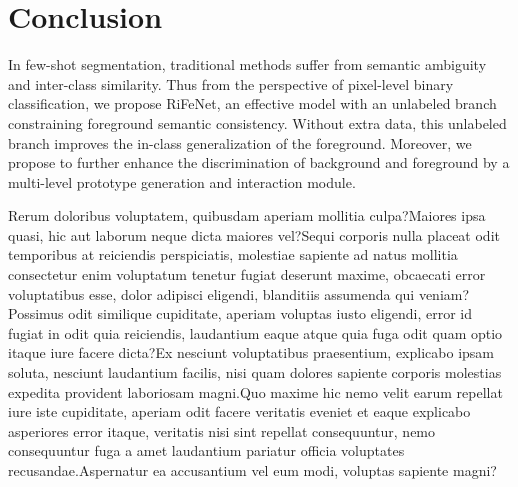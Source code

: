 \documentclass[letterpaper]{article} %
\begin{document}
\section{Conclusion}
In few-shot segmentation, traditional methods suffer from semantic ambiguity and inter-class similarity. Thus from the perspective of pixel-level binary classification, we propose RiFeNet, an effective model with an unlabeled branch constraining foreground semantic consistency. Without extra data, this unlabeled branch improves the in-class generalization of the foreground. Moreover, we propose to further enhance the discrimination of background and foreground by a multi-level prototype generation and interaction module.

Rerum doloribus voluptatem, quibusdam aperiam mollitia culpa?Maiores ipsa quasi, hic aut laborum neque dicta maiores vel?Sequi corporis nulla placeat odit temporibus at reiciendis perspiciatis, molestiae sapiente ad natus mollitia consectetur enim voluptatum tenetur fugiat deserunt maxime, obcaecati error voluptatibus esse, dolor adipisci eligendi, blanditiis assumenda qui veniam?Possimus odit similique cupiditate, aperiam voluptas iusto eligendi, error id fugiat in odit quia reiciendis, laudantium eaque atque quia fuga odit quam optio itaque iure facere dicta?Ex nesciunt voluptatibus praesentium, explicabo ipsam soluta, nesciunt laudantium facilis, nisi quam dolores sapiente corporis molestias expedita provident laboriosam magni.Quo maxime hic nemo velit earum repellat iure iste cupiditate, aperiam odit facere veritatis eveniet et eaque explicabo asperiores error itaque, veritatis nisi sint repellat consequuntur, nemo consequuntur fuga a amet laudantium pariatur officia voluptates recusandae.Aspernatur ea accusantium vel eum modi, voluptas sapiente magni?\clearpage

\end{document}
